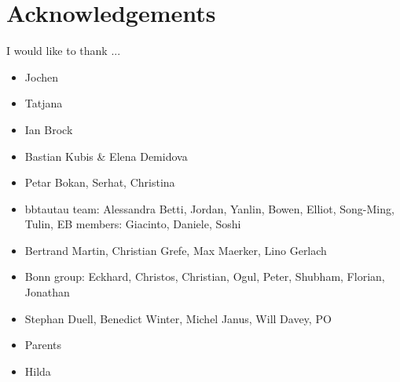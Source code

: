 \chapter*{Acknowledgements}
\label{sec:ack}

I would like to thank ...

\begin{itemize}
\item Jochen
\item Tatjana
\item Ian Brock
\item Bastian Kubis \& Elena Demidova
\item Petar Bokan, Serhat, Christina
\item bbtautau team: Alessandra Betti, Jordan, Yanlin, Bowen, Elliot, Song-Ming,
  Tulin, EB members: Giacinto, Daniele, Soshi
\item Bertrand Martin, Christian Grefe, Max Maerker, Lino Gerlach
\item Bonn group: Eckhard, Christos, Christian, Ogul, Peter, Shubham, Florian,
  Jonathan
\item Stephan Duell, Benedict Winter, Michel Janus, Will Davey, PO
\item Parents
\item Hilda
\end{itemize}

